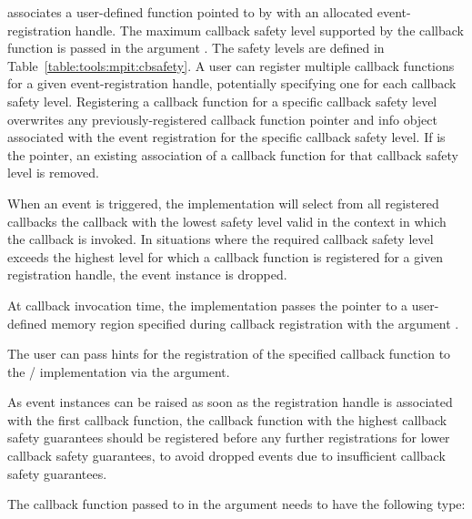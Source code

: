  associates a user-defined
function pointed to by  with an
allocated event-registration handle.
The maximum callback safety level supported
by the callback function is passed in the argument .  
The safety levels are defined in Table~\ref{table:tools:mpit:cbsafety}.
A user can
register multiple callback functions for a given event-registration handle, potentially
specifying one for each callback safety level. 
Registering a callback function for a specific callback safety level
overwrites any previously-registered callback function pointer and info
object associated with the event
registration for the specific callback safety level. If
 is the  pointer, an existing association
of a callback function for that callback safety level is removed.

When an event is triggered, the implementation will select from all registered callbacks
the callback with the lowest safety level valid in the context in which the callback
is invoked.  In situations where the required callback
safety level exceeds the highest level for which a callback function is 
registered for a given registration handle, the event instance is dropped.  

At callback invocation time, the implementation passes the pointer to a user-defined memory region specified during
callback registration with the argument .

The user can pass hints for
the registration of the specified callback function to the \MPI/ implementation via the 
argument.

\begin{users}
    As event instances can be raised as soon as the registration handle is
    associated with the first callback function, the callback function with
    the highest callback safety guarantees should be registered before any
    further registrations for lower callback safety guarantees, to avoid
    dropped events due to insufficient callback safety guarantees.
\end{users}

The callback function passed to 
in the argument  needs to have the following
type:


